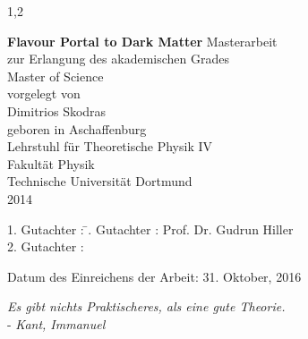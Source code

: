 \documentclass[11pt,a4paper,twoside]{article}
\begin{document}
\begin{spacing}{1,2}

%
%


\newcommand{\thetitle}{Flavour Portal to Dark Matter}

\thispagestyle{empty}
\begin{center}

\Huge\textbf{\thetitle}
\vfill
\vfill
\Large
Masterarbeit\\ zur Erlangung des akademischen Grades \\ Master of Science \\
\vspace{20pt}
\normalsize
vorgelegt von \\[5pt]
{\Large Dimitrios Skodras} \\[5pt]
geboren in Aschaffenburg \\
\vspace{20pt}
Lehrstuhl für Theoretische Physik IV \\ Fakultät Physik \\
Technische Universität Dortmund \\ 2014
\end{center}
\newpage

\thispagestyle{empty}
\vspace*{\fill}
\begin{tabbing}
1. Gutachter : \=. Gutachter : \>Prof. Dr. Gudrun Hiller \\[11pt]
2. Gutachter : \> \\[11pt]
\end{tabbing}
\vspace{11pt}
Datum des Einreichens der Arbeit: 31. Oktober, 2016
\newpage
\thispagestyle{empty}
\begin{flushright} 
\textit{\grqq Es gibt nichts Praktischeres, als eine gute Theorie.\grqq}\\
- \textit{Kant, Immanuel}\\
\vspace{2cm}
\end{flushright}


\end{spacing}
\end{document}
